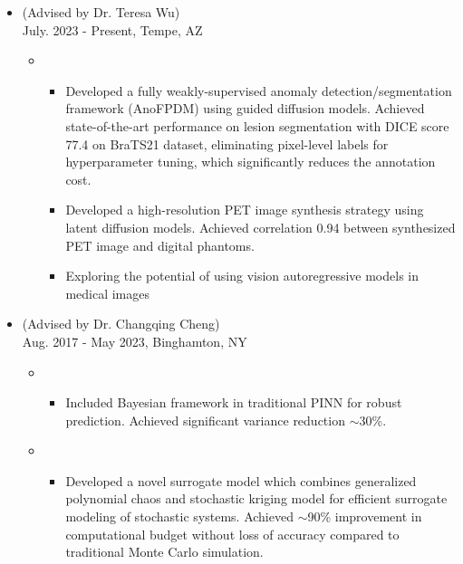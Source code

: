 \documentclass[10pt]{article}
\begin{document}
\begin{itemize}
	\item {} (Advised by Dr. Teresa Wu)\\
        \hfill{July. 2023 - Present, Tempe, AZ}
		\vspace{-0.5em}
        \begin{itemize}[label=$\bullet$]
			\setlength\itemsep{0.5pt}
            \item {}
            \vspace{-0.5em}
            \begin{itemize}[label=$-$]
				\item Developed a fully weakly-supervised anomaly detection/segmentation framework (AnoFPDM) using guided diffusion models. Achieved state-of-the-art performance on lesion segmentation with DICE score 77.4 on BraTS21 dataset, eliminating pixel-level labels for hyperparameter tuning, which significantly reduces the annotation cost.
				\item Developed a high-resolution PET image synthesis strategy using latent diffusion models. Achieved correlation 0.94 between synthesized PET image and digital phantoms.
				\item Exploring the potential of using vision autoregressive models in medical images 
			\end{itemize}
        \end{itemize}
        
	\item {} (Advised by Dr. Changqing Cheng)\\
		\hfill{Aug. 2017 - May 2023, Binghamton, NY}
		\vspace{-0.5em}

		\begin{itemize}[label=$\bullet$]
			\setlength\itemsep{0.5pt}
			\item {}
			\vspace{-0.5em}
			\begin{itemize}[label=$\bullet$]
				\setlength\itemsep{0.5pt}
				\item Included Bayesian framework in traditional PINN for robust prediction. Achieved significant variance reduction $\sim$30\%.
			\end{itemize}
			
			\item {}
			\vspace{-0.5em}
			\begin{itemize}[label=$\bullet$]
				\setlength\itemsep{0.5pt}
				\item Developed a novel surrogate model which combines generalized polynomial chaos and stochastic kriging model for efficient surrogate modeling of stochastic systems. Achieved $\sim$90\% improvement in computational budget without loss of accuracy compared to traditional Monte Carlo simulation.
			

\end{itemize}
\end{itemize}
\end{itemize}
\end{document}
